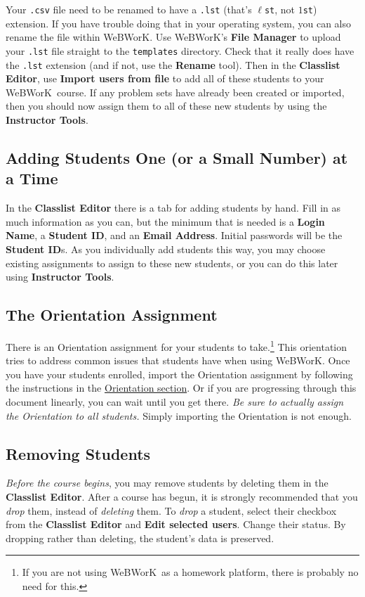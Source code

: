 \documentclass[12pt]{article}
\newcommand{\menu}[1]{\textbf{#1}}
\newcommand{\WW}{WeBWorK}
\begin{document}
Your \texttt{.csv} file need to be renamed to have a \texttt{.lst} (that's $\ell$\texttt{st}, not
$1$\texttt{st}) extension. If you have trouble doing that in your operating system, you can also rename the file within \WW. Use \WW's \menu{File Manager} to upload your \texttt{.lst} file straight to the \texttt{templates} directory. Check that it really does have the \texttt{.lst} extension (and if not, use the \menu{Rename} tool). Then in the \menu{Classlist Editor}, use \menu{Import users from file} to add all of these students to your \WW\ course. If any problem sets have already been created or imported, then you should now assign them to all of these new students by using the \menu{Instructor Tools}.


\subsection{Adding Students One (or a Small Number) at a Time}
In the \menu{Classlist Editor} there is a tab for adding students by hand.  Fill in as much information as you can, but the minimum that is needed is a \menu{Login Name}, a \menu{Student ID}, and an \menu{Email Address}. Initial passwords will be the \menu{Student ID}s.  As you individually add students this way, you may choose existing assignments to assign to these new students, or you can do this later using \menu{Instructor Tools}.

\subsection{The Orientation Assignment}
There is an Orientation assignment for your students to take.\footnote{If you are not using \WW\ as a homework platform, there is probably no need for this.} This orientation tries to address common issues that students have when using \WW. Once you have your students enrolled, import the Orientation assignment by following the instructions in the \hyperref[orientation]{Orientation section}. Or if you are progressing through this document linearly, you can wait until you get there. \emph{Be sure to actually assign the Orientation to all students.} Simply importing the Orientation is not enough.

\subsection{Removing Students}
\emph{Before the course begins}, you may remove students by deleting them in the \menu{Classlist Editor}. After a course has begun, it is strongly recommended that you \emph{drop} them, instead of \emph{deleting} them.  To \emph{drop} a student, select their checkbox from the \menu{Classlist Editor} and \menu{Edit selected users}.  Change their status.  By dropping rather than deleting, the student's data is preserved.
\end{document}
